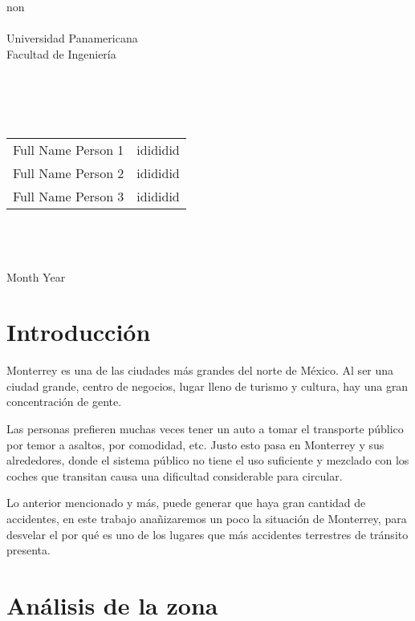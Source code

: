 \documentclass[a4paper]{article}
\begin{document}
\hspace{0pt}
\vfill

\begin{center}
    {\huge {{ non }}}\\    \quad\\
    {\large Universidad Panamericana}\\
    {\large Facultad de Ingeniería}\\
    \quad\\
    \quad\\

    \quad\\
    \quad\\
    \begin{tabular}{c|c}
        Full Name Person 1 & idididid\\
        Full Name Person 2 & idididid\\
        Full Name Person 3 & idididid\\
    \end{tabular}\\
    \quad\\
    \quad\\
    Month Year\\
\end{center}

\vfill
\newpage


\section{Introducción}
Monterrey es una de las ciudades más grandes del norte de México. Al ser una ciudad grande, centro de negocios, lugar lleno de turismo y cultura, hay una gran concentración de gente.

Las personas prefieren muchas veces tener un auto a tomar el transporte público por temor a asaltos, por comodidad, etc. Justo esto pasa en Monterrey y sus alrededores, donde el sistema público no tiene el uso suficiente y mezclado con los coches que transitan causa una dificultad considerable para circular.

Lo anterior mencionado y más, puede generar que haya gran cantidad de accidentes, en este trabajo anañizaremos un poco la situación de Monterrey, para desvelar el por qué es uno de los lugares que más accidentes terrestres de tránsito presenta.
 
\section{Análisis de la zona}
\end{document}
